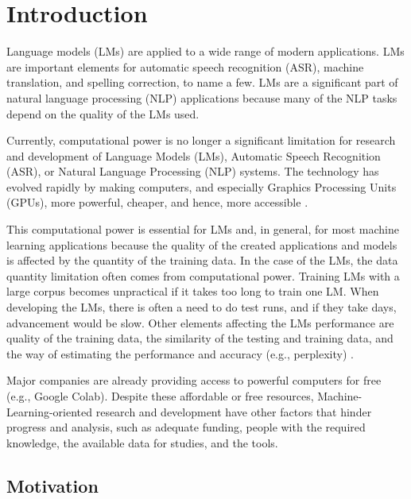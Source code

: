 \newpage


\chapter{Introduction}

Language models (LMs) are applied to a wide range of modern applications. LMs are important elements for automatic speech recognition (ASR), machine translation, and spelling correction, to name a few. LMs are a significant part of natural language processing (NLP) applications because many of the NLP tasks depend on the quality of the LMs used. \parencite{chelba2013one}

Currently, computational power is no longer a significant limitation for research and development of Language Models (LMs), Automatic Speech Recognition (ASR), or Natural Language Processing (NLP) systems. The technology has evolved rapidly by making computers, and especially Graphics Processing Units  (GPUs), more powerful, cheaper, and hence, more accessible \parencite{you2019large,chen2014efficient,colic2010exploring}.

This computational power is essential for LMs and, in general, for most machine learning applications because the quality of the created applications and models is affected by the quantity of the training data. In the case of the LMs, the data quantity limitation often comes from computational power. Training LMs with a large corpus becomes unpractical if it takes too long to train one LM. When developing the LMs,  there is often a need to do test runs, and if they take days, advancement would be slow. Other elements affecting the LMs performance are quality of the training data, the similarity of the testing and training data, and the way of estimating the performance and accuracy (e.g., perplexity) \parencite{chelba2013one}.

Major companies are already providing access to powerful computers for free (e.g., Google Colab). Despite these affordable or free resources, Machine-Learning-oriented research and development have other factors that hinder progress and analysis, such as adequate funding, people with the required knowledge, the available data for studies, and the tools.

\section{Motivation}

